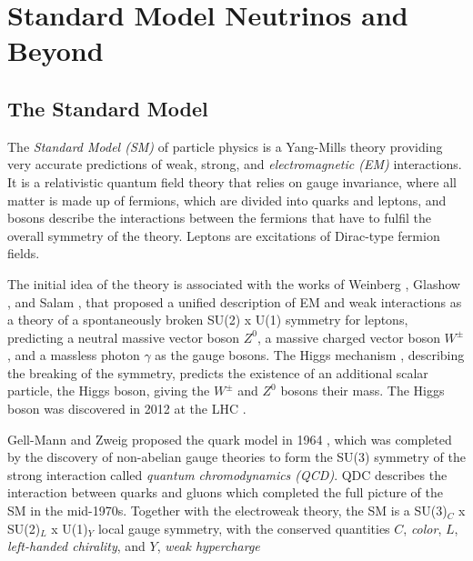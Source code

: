 \setchapterpreamble[u]{\margintoc}

\chapter{Standard Model Neutrinos and Beyond}


\section{The Standard Model}

The \textit{Standard Model (SM)} of particle physics is a Yang-Mills theory  providing very accurate predictions of weak, strong, and \textit{electromagnetic (EM)} interactions. It is a relativistic quantum field theory that relies on gauge invariance, where all matter is made up of fermions, which are divided into quarks and leptons, and bosons describe the interactions between the fermions that have to fulfil the overall symmetry of the theory. Leptons are excitations of Dirac-type fermion fields.

The initial idea of the theory is associated with the works of Weinberg , Glashow , and Salam \cite{Salam}, that proposed a unified description of EM and weak interactions as a theory of a spontaneously broken SU(2) x U(1) symmetry for leptons, predicting a neutral massive vector boson $Z^0$, a massive charged vector boson $W^\pm$, and a massless photon $\gamma$ as the gauge bosons. The Higgs mechanism , describing the breaking of the symmetry, predicts the existence of an additional scalar particle, the Higgs boson, giving the $W^\pm$ and $Z^0$ bosons their mass. The Higgs boson was discovered in 2012 at the LHC .

Gell-Mann and Zweig proposed the quark model in 1964 , which was completed by the discovery of non-abelian gauge theories \cite{non_abel_gauge} to form the SU(3) symmetry of the strong interaction called \textit{quantum chromodynamics (QCD)}. QDC describes the interaction between quarks and gluons which completed the full picture of the SM in the mid-1970s. Together with the electroweak theory, the SM is a SU(3)$_C$ x SU(2)$_L$ x U(1)$_Y$ local gauge symmetry, with the conserved quantities $C$, \textit{color}, $L$, \textit{left-handed chirality}, and $Y$, \textit{weak hypercharge}

